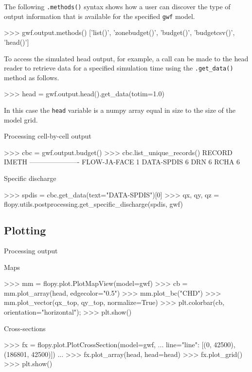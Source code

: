\documentclass[11pt, oneside]{article}   	%
\begin{document}
The following \texttt{.methods()} syntax shows how a user can discover the type of output information that is available for the specified \texttt{gwf} model.

\begin{python}
>>> gwf.output.methods()
['list()', 'zonebudget()', 'budget()', 'budgetcsv()', 'head()']
\end{python}

\noindent To access the simulated head output, for example, a call can be made to the head reader to retrieve data for a specified simulation time using the \texttt{.get\_data()} method as follows.

\begin{python}
>>> head = gwf.output.head().get_data(totim=1.0)
\end{python}

\noindent In this case the \texttt{head} variable is a numpy array equal in size to the size of the model grid.  

Processing cell-by-cell output 

\begin{python}
>>> cbc = gwf.output.budget()
>>> cbc.list_unique_records()
RECORD           IMETH
----------------------
FLOW-JA-FACE         1
DATA-SPDIS           6
DRN                  6
RCHA                 6
\end{python}

Specific discharge

\begin{python}
>>> spdis = cbc.get_data(text="DATA-SPDIS")[0]
>>> qx, qy, qz = flopy.utils.postprocessing.get_specific_discharge(spdis, gwf)
\end{python}

\subsection{Plotting}

Processing output

Maps

\begin{python}
>>> mm = flopy.plot.PlotMapView(model=gwf)
>>> cb = mm.plot_array(head, edgecolor="0.5")
>>> mm.plot_bc("CHD")
>>> mm.plot_vector(qx_top, qy_top, normalize=True)
>>> plt.colorbar(cb, orientation="horizontal");
>>> plt.show()
\end{python}

Cross-sections 

\begin{python}
>>> fx = flopy.plot.PlotCrossSection(model=gwf, 
... line={"line": [(0, 42500), (186801, 42500)]})
...
>>> fx.plot_array(head, head=head)
>>> fx.plot_grid()
>>> plt.show()
\end{python}
\end{document}
